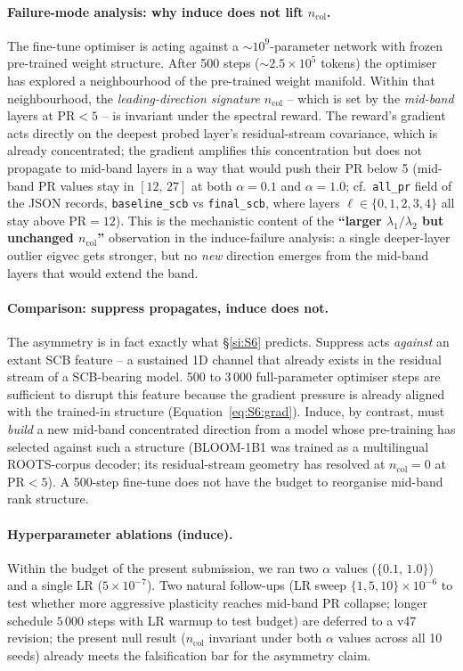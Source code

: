 \documentclass[11pt,a4paper]{article}
\begin{document}
\paragraph{Failure-mode analysis: why induce does not lift $n_\mathrm{col}$.}
The fine-tune optimiser is acting against a $\sim\!10^9$-parameter
network with frozen pre-trained weight structure. After 500 steps
($\sim\!2.5\!\times\!10^5$ tokens) the optimiser has explored a
neighbourhood of the pre-trained weight manifold. Within that
neighbourhood, the \emph{leading-direction signature}
$n_\mathrm{col}$ -- which is set by the \emph{mid-band} layers at
PR$\!<\!5$ -- is invariant under the spectral reward. The reward's
gradient acts directly on the deepest probed layer's residual-stream
covariance, which is already concentrated; the gradient amplifies
this concentration but does not propagate to mid-band layers in a
way that would push their PR below 5 (mid-band PR values stay in
$[12,\,27]$ at both $\alpha\!=\!0.1$ and $\alpha\!=\!1.0$;
cf.\ \texttt{all\_pr} field of the JSON records,
\texttt{baseline\_scb} vs \texttt{final\_scb}, where layers
$\ell\!\in\!\{0,1,2,3,4\}$ all stay above PR$\!=\!12$).
This is the mechanistic content of the
\textbf{``larger $\lambda_1/\lambda_2$ but unchanged $n_\mathrm{col}$''}
observation in the induce-failure analysis: a single deeper-layer
outlier eigvec gets stronger, but no \emph{new} direction emerges
from the mid-band layers that would extend the band.

\paragraph{Comparison: suppress propagates, induce does not.}
The asymmetry is in fact exactly what \S\ref{si:S6} predicts. Suppress
acts \emph{against} an extant SCB feature -- a sustained 1D channel
that already exists in the residual stream of a SCB-bearing model.
500 to 3\,000 full-parameter optimiser steps are sufficient to disrupt
this feature because the gradient pressure is already aligned with
the trained-in structure (Equation~\eqref{eq:S6:grad}). Induce, by
contrast, must \emph{build} a new mid-band concentrated direction
from a model whose pre-training has selected against such a
structure (BLOOM-1B1 was trained as a multilingual ROOTS-corpus
decoder; its residual-stream geometry has resolved at
$n_\mathrm{col}\!=\!0$ at PR$\!<\!5$). A 500-step fine-tune does not
have the budget to reorganise mid-band rank structure.

\paragraph{Hyperparameter ablations (induce).}
Within the budget of the present submission, we ran two $\alpha$
values ($\{0.1,\,1.0\}$) and a single LR ($5\!\times\!10^{-7}$).
Two natural follow-ups (LR sweep $\{1, 5, 10\}\!\times\!10^{-6}$
to test whether more aggressive plasticity reaches mid-band PR
collapse; longer schedule $5\,000$ steps with LR warmup to test
budget) are deferred to a v47 revision; the present null result
($n_\mathrm{col}$ invariant under both $\alpha$ values across all
10 seeds) already meets the falsification bar for the asymmetry
claim.
\end{document}
